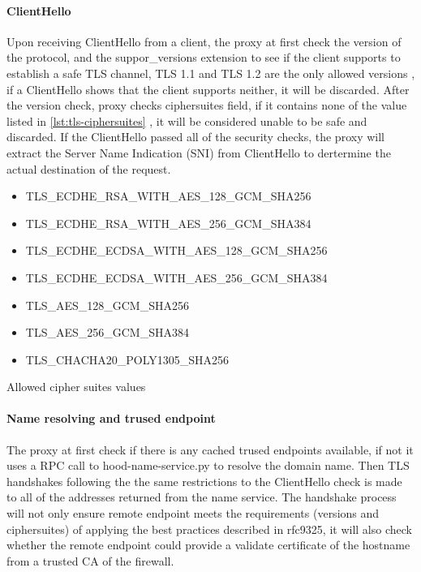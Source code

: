 \documentclass[mscthesis]{usiinfthesis}
\begin{document}
\paragraph{ClientHello}
Upon receiving ClientHello from a client, the proxy at first check the version of the protocol, and the suppor\_versions extension to see if the client supports to establish a safe TLS channel, TLS 1.1 and TLS 1.2 are the only allowed versions \citep{rfc:bstprc}, if a ClientHello shows that the client supports neither, it will be discarded. After the version check, proxy checks ciphersuites field, if it contains none of the value listed in \ref{lst:tls-ciphersuites} \citep{rfc:bstprc}, it will be considered unable to be safe and discarded. If the ClientHello passed all of the security checks, the proxy will extract the Server Name Indication (SNI) from ClientHello to dertermine the actual destination of the request.

\begin{table}[H]
  \begin{itemize}
    \item TLS\_ECDHE\_RSA\_WITH\_AES\_128\_GCM\_SHA256
    \item TLS\_ECDHE\_RSA\_WITH\_AES\_256\_GCM\_SHA384
    \item TLS\_ECDHE\_ECDSA\_WITH\_AES\_128\_GCM\_SHA256
    \item TLS\_ECDHE\_ECDSA\_WITH\_AES\_256\_GCM\_SHA384
    \item TLS\_AES\_128\_GCM\_SHA256
    \item TLS\_AES\_256\_GCM\_SHA384
    \item TLS\_CHACHA20\_POLY1305\_SHA256
  \end{itemize}
  \caption{Allowed cipher suites values}
  \label{lst:tls-ciphersuites}
\end{table}

\paragraph{Name resolving and trused endpoint}
The proxy at first check if there is any cached trused endpoints available, if not it uses a RPC call to hood-name-service.py to resolve the domain name. Then TLS handshakes following the the same restrictions to the ClientHello check is made to all of the addresses returned from the name service. The handshake process will not only ensure remote endpoint meets the requirements (versions and ciphersuites) of applying the best practices described in rfc9325, it will also check whether the remote endpoint could provide a validate certificate of the hostname from a trusted CA of the firewall.
\end{document}
